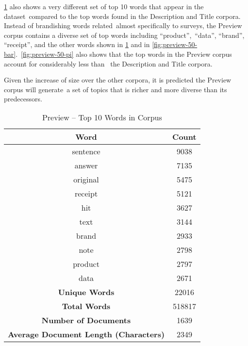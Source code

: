 \documentclass[letterpaper,12pt]{article}
\begin{document}
\ref{tab:preview_top_words} also shows a very different set of top 10 words that appear in the dataset\
compared to the top words found in the Description and Title corpora. Instead of brandishing words related\
almost specifically to surveys, the Preview corpus contains a diverse set of top words including ``product'',\
``data'', ``brand'', ``receipt'', and the other words shown in \ref{tab:preview_top_words} and in \ref{fig:preview-50-bar}.\
\ref{fig:preview-50-pi} also shows that the top words in the Preview corpus account for considerably less than \
the Description and Title corpora.

Given the increase of size over the other corpora, it is predicted the Preview corpus will generate\
a set of topics that is richer and more diverse than its predecessors.

\begin{table}
	\caption{\label{tab:preview_top_words} Preview -- Top 10 Words in Corpus}
	\begin{center}
		\begin{tabular}{|c|c|}
			\hline
			\textbf{Word} & \textbf{Count} \\
			\hline
			sentence & 9038 \\
			\hline
			answer & 7135 \\
			\hline
			original & 5475 \\
			\hline
			receipt & 5121 \\
			\hline
			hit & 3627 \\
			\hline
			text & 3144 \\
			\hline
			brand & 2933 \\
			\hline
			note & 2798 \\
			\hline
			product & 2797 \\
			\hline
			data & 2671 \\
			\hline
			\textbf{Unique Words} & 22016 \\
			\hline
			\textbf{Total Words} & 518817 \\
			\hline
			\textbf{Number of Documents} & 1639 \\
			\hline
			\textbf{Average Document Length (Characters)} & 2349 \\
			\hline
		\end{tabular}
	\end{center}
\end{table}


\end{document}
